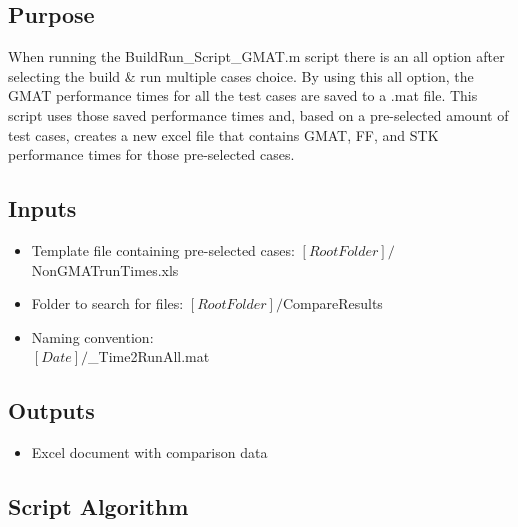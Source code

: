 \subsection{Purpose}
When running the BuildRun\_Script\_GMAT.m script there is an all
option after selecting the build \& run multiple cases choice. By
using this all option, the GMAT performance times for all the test
cases are saved to a .mat file. This script uses those saved
performance times and, based on a pre-selected amount of test cases,
creates a new excel file that contains GMAT, FF, and STK performance
times for those pre-selected cases.
\subsection{Inputs}
\begin{itemize}
    \item Template file containing pre-selected cases:
    $[Root Folder]/$NonGMATrunTimes.xls
    \item Folder to search for files:
    $[Root Folder]/$CompareResults
    \item Naming convention:\\
    $[Date]/$\_Time2RunAll.mat
\end{itemize}
\subsection{Outputs}
\begin{itemize}
    \item Excel document with comparison data
\end{itemize}
\subsection{Script Algorithm}
